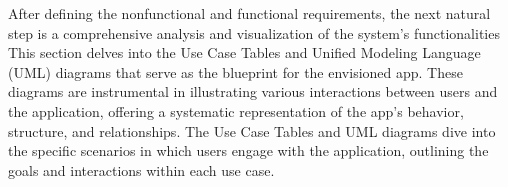 After defining the nonfunctional and functional requirements, the next natural step is a comprehensive analysis and visualization of the system's functionalities This section delves into the Use Case Tables and Unified Modeling Language (UML) diagrams that serve as the blueprint for the envisioned app. These diagrams are instrumental in illustrating various interactions between users and the application, offering a systematic representation of the app's behavior, structure, and relationships. The Use Case Tables and UML diagrams dive into the specific scenarios in which users engage with the application, outlining the goals and interactions within each use case.



